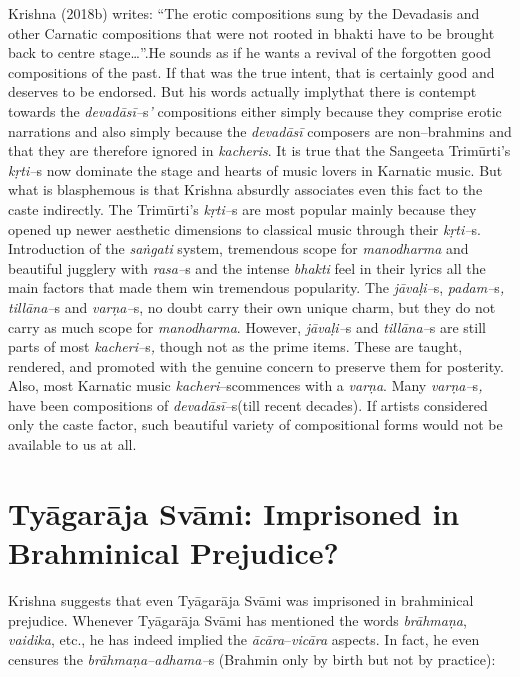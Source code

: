 Krishna (2018b) writes: “The erotic compositions sung by the Devadasis and other Carnatic compositions that were not rooted in bhakti have to be brought back to centre stage…”.He sounds as if he wants a revival of the forgotten good compositions of the past. If that was the true intent, that is certainly good and deserves to be endorsed. But his words actually implythat there is contempt towards the \textit{devadāsī–}s\textit{’} compositions either simply because they comprise erotic narrations and also simply because the \textit{devadāsī} composers are non–brahmins and that they are therefore ignored in \textit{kacheris}. It is true that the Sangeeta Trimūrti’s \textit{kṛti–}s now dominate the stage and hearts of music lovers in Karnatic music. But what is blasphemous is that Krishna absurdly associates even this fact to the caste indirectly. The Trimūrti’s \textit{kṛti–}s are most popular mainly because they opened up newer aesthetic dimensions to classical music through their \textit{kṛti–}s. Introduction of the \textit{saṅgati} system, tremendous scope for \textit{manodharma} and beautiful jugglery with \textit{rasa–}s and the intense \textit{bhakti} feel in their lyrics all the main factors that made them win tremendous popularity. The \textit{jāvaḷi–}s, \textit{padam–}s\textit{, tillāna–}s and \textit{varṇa–}s, no doubt carry their own unique charm, but they do not carry as much scope for \textit{manodharma}. However, \textit{jāvaḷi–}s and \textit{tillāna–}s are still parts of most \textit{kacheri–}s\textit{,} though not as the prime items. These are taught, rendered, and promoted with the genuine concern to preserve them for posterity. Also, most Karnatic music \textit{kacheri}–scommences with a \textit{varṇa}. Many \textit{varṇa–}s\textit{,} have been compositions of \textit{devadāsī–}s(till recent decades). If artists considered only the caste factor, such beautiful variety of compositional forms would not be available to us at all.


\section*{Tyāgarāja Svāmi: Imprisoned in Brahminical Prejudice?}

Krishna suggests that even Tyāgarāja Svāmi was imprisoned in brahminical prejudice.  Whenever Tyāgarāja Svāmi has mentioned the words \textit{brāhmaṇa}, \textit{vaidika}, etc., he has indeed implied the \textit{ācāra}–\textit{vicāra} aspects. In fact, he even censures the \textit{brāhmaṇa–adhama–}s (Brahmin only by birth but not by practice):

